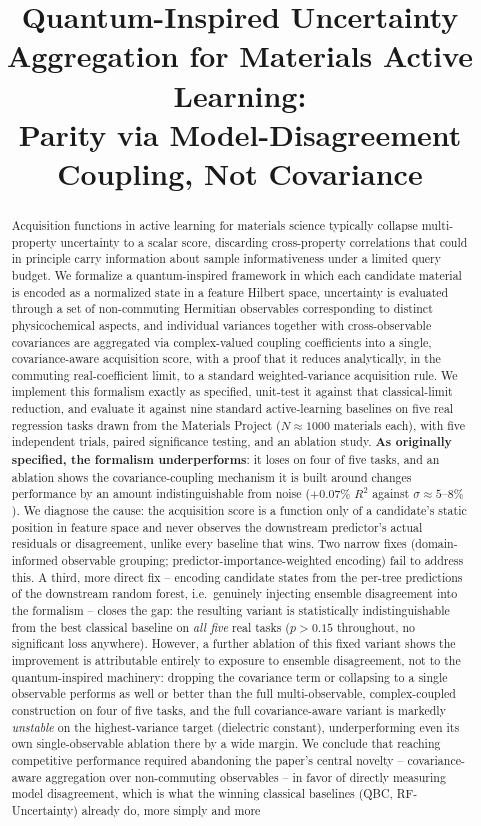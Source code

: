 \documentclass[conference]{IEEEtran}
\title{Quantum-Inspired Uncertainty Aggregation for Materials Active Learning:\\Parity via Model-Disagreement Coupling, Not Covariance}
\author{
\IEEEauthorblockN{Arnav Kapoor\orcidlink{0009-0007-9818-7908}}
\IEEEauthorblockA{
Indian Institute of Science Education and Research Bhopal, Bhopal 462066, India\\
arnavkapoor23@iiserb.ac.in
}
}
\begin{document}
\maketitle

\begin{abstract}
Acquisition functions in active learning for materials science typically collapse multi-property uncertainty to a scalar score, discarding cross-property correlations that could in principle carry information about sample informativeness under a limited query budget. We formalize a quantum-inspired framework in which each candidate material is encoded as a normalized state in a feature Hilbert space, uncertainty is evaluated through a set of non-commuting Hermitian observables corresponding to distinct physicochemical aspects, and individual variances together with cross-observable covariances are aggregated via complex-valued coupling coefficients into a single, covariance-aware acquisition score, with a proof that it reduces analytically, in the commuting real-coefficient limit, to a standard weighted-variance acquisition rule. We implement this formalism exactly as specified, unit-test it against that classical-limit reduction, and evaluate it against nine standard active-learning baselines on five real regression tasks drawn from the Materials Project ($N\approx 1000$ materials each), with five independent trials, paired significance testing, and an ablation study. \textbf{As originally specified, the formalism underperforms}: it loses on four of five tasks, and an ablation shows the covariance-coupling mechanism it is built around changes performance by an amount indistinguishable from noise ($+0.07\%$ $R^2$ against $\sigma\approx5$--$8\%$). We diagnose the cause: the acquisition score is a function only of a candidate's static position in feature space and never observes the downstream predictor's actual residuals or disagreement, unlike every baseline that wins. Two narrow fixes (domain-informed observable grouping; predictor-importance-weighted encoding) fail to address this. A third, more direct fix -- encoding candidate states from the per-tree predictions of the downstream random forest, i.e.\ genuinely injecting ensemble disagreement into the formalism -- closes the gap: the resulting variant is statistically indistinguishable from the best classical baseline on \emph{all five} real tasks ($p>0.15$ throughout, no significant loss anywhere). However, a further ablation of this fixed variant shows the improvement is attributable entirely to exposure to ensemble disagreement, not to the quantum-inspired machinery: dropping the covariance term or collapsing to a single observable performs as well or better than the full multi-observable, complex-coupled construction on four of five tasks, and the full covariance-aware variant is markedly \emph{unstable} on the highest-variance target (dielectric constant), underperforming even its own single-observable ablation there by a wide margin. We conclude that reaching competitive performance required abandoning the paper's central novelty -- covariance-aware aggregation over non-commuting observables -- in favor of directly measuring model disagreement, which is what the winning classical baselines (QBC, RF-Uncertainty) already do, more simply and more 
\end{abstract}
\end{document}
